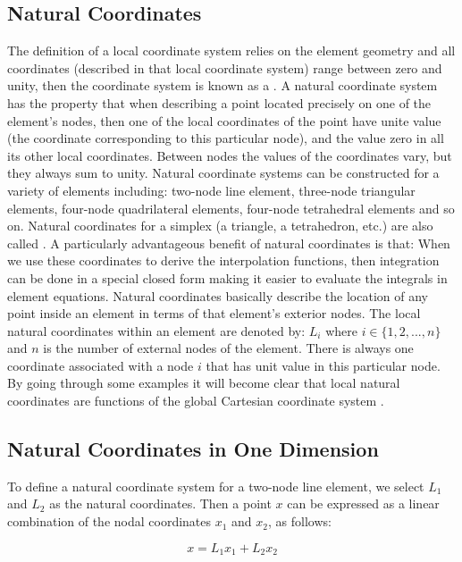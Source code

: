 \subsection{Natural Coordinates}
The definition of a local coordinate system relies on the element
geometry and all coordinates (described in that
local coordinate system) range between zero and unity, then the
coordinate system is known as a .
A natural coordinate system has the property that when describing a
point located precisely on one of the element's nodes, then one of the
local coordinates of the point have unite value (the coordinate
corresponding to this particular node), and the value zero in all
its other local coordinates.
Between nodes the values of the coordinates vary, but they
always sum to unity. Natural coordinate
systems can be constructed for a variety of elements including:
two-node line element, three-node triangular elements,
four-node quadrilateral elements, four-node tetrahedral
elements and so on.
%
Natural coordinates for a simplex (a triangle, a tetrahedron, etc.) are
also called .
%
A particularly advantageous benefit of natural coordinates is that:
When we use these coordinates to derive the interpolation functions,
then integration can be done in a special closed form making it easier
to evaluate the integrals in element equations.
%
Natural coordinates basically describe the location of any point
inside an element in terms of that element's exterior nodes. The
local natural coordinates within an element are denoted by: $L_i$
where $i \in \{1, 2, ..., n\}$ and $n$ is the number of external nodes
of the element. There is always one coordinate associated with a node
$i$ that has unit value in this particular node.
%
By going through some examples it will become clear that local natural
coordinates are functions of the global Cartesian coordinate system
.

\subsection{Natural Coordinates in One Dimension}
To define a natural coordinate system for a two-node line
element, we select $L_1$ and $L_2$ as the natural
coordinates. Then a point $x$ can be expressed as a linear
combination of the nodal coordinates $x_1$ and $x_2$, as follows:

\begin{equation}
\label{eq:1d-linear-combination}
x = L_1 x_1 + L_2 x_2
\end{equation}

